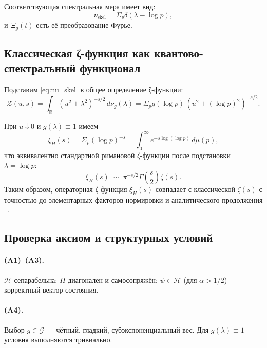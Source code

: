 \documentclass{article}
\numberwithin{equation}{section}
\theoremstyle{plain}
\theoremstyle{definition}
\theoremstyle{remark}
\def\alpha{α}\def\beta{β}\def\gamma{γ}\def\Gamma{Γ}%
\def\delta{δ}\def\Delta{Δ}\def\epsilon{ε}\def\zeta{ζ}%
\def\infty{∞}\def\partial{∂}\def\sum{Σ}\def\int{∫}%
\begin{document}
Соответствующая спектральная мера имеет вид:
\begin{equation}
\label{eq:nu_skel}
\nu_{\mathrm{skel}}
= \sum_{p}\delta(\lambda-\log p),
\end{equation}
и $\Xi_g(t)$ есть её преобразование Фурье.

\subsection*{Классическая ζ-функция как квантово-спектральный функционал}

Подставим \eqref{eq:nu_skel} в общее определение ζ-функции:
\begin{equation}
\mathcal Z(u,s)
= \int_{\mathbb R}(u^2+\lambda^2)^{-s/2}\,d\nu_g(\lambda)
= \sum_p g(\log p)\,(u^2+(\log p)^2)^{-s/2}.
\end{equation}

При $u\downarrow0$ и $g(\lambda)\equiv1$ имеем
\begin{equation}
\xi_H(s) = \sum_p (\log p)^{-s}
= \int_0^\infty e^{-s\log(\log p)}\,d\mu(p),
\end{equation}
что эквивалентно стандартной римановой ζ-функции после подстановки
$\lambda=\log p$:
\begin{equation}
\xi_H(s)
\;\sim\;
\pi^{-s/2}\Gamma\!\left(\frac{s}{2}\right)\zeta(s).
\end{equation}
Таким образом, операторная ζ-функция $\xi_H(s)$
совпадает с классической $\zeta(s)$ с точностью до элементарных факторов
нормировки и аналитического продолжения ~\cite{Edwards1974}.

\subsection*{Проверка аксиом и структурных условий}

\paragraph{(A1)–(A3).}
$\mathcal H$ сепарабельна; $H$ диагонален и самосопряжён;
$\psi\in\mathcal H$ (для $\alpha>1/2$) — корректный вектор состояния.

\paragraph{(A4).}
Выбор $g\in\mathcal G$ — чётный, гладкий, субэкспоненциальный вес.
Для $g(\lambda)\equiv1$ условия выполняются тривиально.
\end{document}
